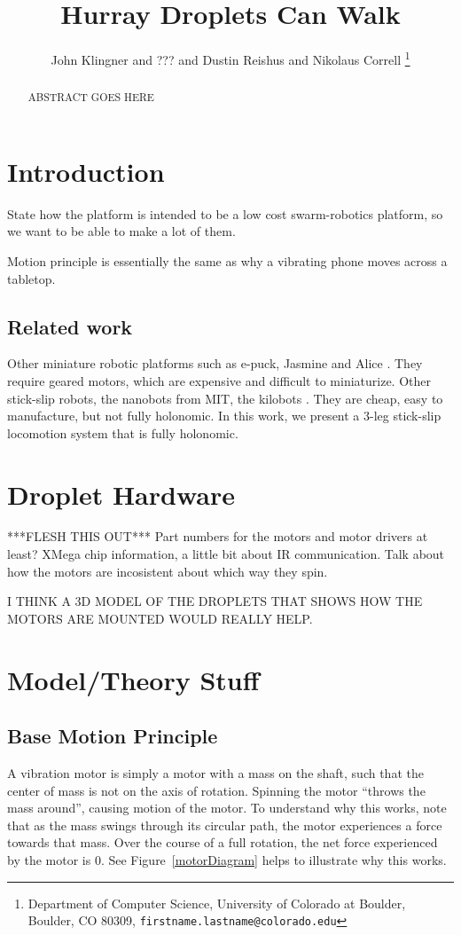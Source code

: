 \documentclass[letterpaper, 10pt, conference]{ieeeconf}
\title{\LARGE \bf
Hurray Droplets Can Walk
}
\author{ John Klingner and ??? and Dustin Reishus and Nikolaus Correll%
\thanks{Department of Computer Science,
University of Colorado at Boulder,
 Boulder, CO 80309,
{\tt\small firstname.lastname{@}colorado.edu}}%
}
\begin{document}
\maketitle

\begin{abstract}
ABSTRACT GOES HERE
\end{abstract}

\section{Introduction}
State how the platform is intended to be a low cost swarm-robotics platform, so we want to be able to make a lot of them.

Motion principle is essentially the same as why a vibrating phone moves across a tabletop.

\subsection{Related work}
Other miniature robotic platforms such as e-puck, Jasmine and Alice \cite{}. They require geared motors, which are expensive and difficult to miniaturize. Other stick-slip robots, the nanobots from MIT, the kilobots \cite{}. They are cheap, easy to manufacture, but not fully holonomic. In this work, we present a 3-leg stick-slip locomotion system that is fully holonomic. 

\section{Droplet Hardware}
***FLESH THIS OUT***
Part numbers for the motors and motor drivers at least? XMega chip information, a little bit about IR communication. Talk about how the motors are incosistent about which way they spin.

I THINK A 3D MODEL OF THE DROPLETS THAT SHOWS HOW THE MOTORS ARE MOUNTED WOULD REALLY HELP.

\section{Model/Theory Stuff}

\subsection{Base Motion Principle}
A vibration motor is simply a motor with a mass on the shaft, such that the center of mass is not on the axis of rotation. Spinning the motor ``throws the mass around'', causing motion of the motor. To understand why this works, note that as the mass swings through its circular path, the motor experiences a force towards that mass. Over the course of a full rotation, the net force experienced by the motor is 0. See Figure~\ref{motorDiagram} helps to illustrate why this works.
\end{document}

